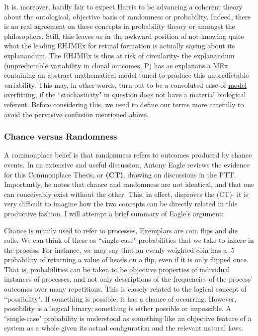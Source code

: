 It is, moreover, hardly fair to expect Harris to be advancing a coherent theory about the ontological, objective basis of randomness or probability. Indeed, there is no real agreement on these concepts in probability theory or amongst the philosophers. Still, this leaves us in the awkward position of not knowing quite what the leading EHJMEx for retinal formation is actually saying about its explanandum. The EHJMEx is thus at risk of circularity- the explanandum (unpredictable variability in clonal outcomes, P) has as explanans a MEx containing an abstract mathematical model tuned to produce this unpredictable variability. This may, in other words, turn out to be a convoluted case of \hyperref[fitting]{model overfitting}, if the ``stochasticity" in question does not have a material biological referent. Before considering this, we need to define our terms more carefully to avoid the pervasive confusion mentioned above.

\subsubsection{Chance versus Randomness}
A commonplace belief is that randomness refers to outcomes produced by chance events. In an extensive and useful discussion, Antony Eagle reviews the evidence for this Commonplace Thesis, or \textbf{(CT)}\cite{Eagle2018}, drawing on discussions in the PTT. Importantly, he notes that chance and randomness are not identical, and that one can conceivably exist without the other. This, in effect, disproves the (CT)- it is very difficult to imagine how the two concepts can be directly related in this productive fashion. I will attempt a brief summary of Eagle's argument:

Chance is mainly used to refer to processes. Exemplars are coin flips and die rolls. We can think of these as ``single-case" probabilities that we take to inhere in the process. For instance, we may say that an evenly weighted coin has a .5 probability of returning a value of heads on a flip, even if it is only flipped once. That is, probabilities can be taken to be objective properties of individual instances of processes, and not only descriptions of the frequencies of the process' outcomes over many repetitions. This is closely related to the logical concept of ``possibility". If something is possible, it has a chance of occurring. However, possibility is a logical binary; something is either possible or impossible. A ``single-case" probability is understood as something like an objective feature of a system as a whole given its actual configuration and the relevant natural laws.  

